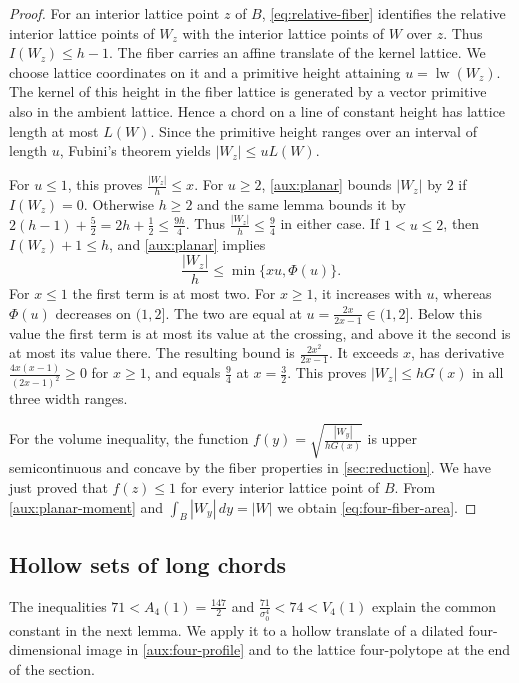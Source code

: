 \documentclass[reqno, 11pt]{article}
\numberwithin{equation}{section}
\theoremstyle{definition}
\DeclareMathOperator{\lw}{lw}
\begin{document}
\begin{proof}
For an interior lattice point $z$ of $B$, \eqref{eq:relative-fiber}
identifies the relative interior lattice points of $W_z$ with the
interior lattice points of $W$ over $z$. Thus $I(W_z)\le h-1$.
The fiber carries an affine translate of the kernel lattice.
We choose lattice coordinates on it and a primitive height attaining
$u=\lw(W_z)$. The kernel of this height in the fiber lattice is
generated by a vector primitive also in the ambient lattice. Hence
a chord on a line of constant height has lattice length at most
$L(W)$. Since the primitive height ranges over an interval of length
$u$, Fubini's theorem yields $|W_z|\le uL(W)$.

For $u\le1$, this proves $\frac{|W_z|}{h}\le x$. For $u\ge2$,
\cref{aux:planar} bounds $|W_z|$ by $2$ if $I(W_z)=0$.
Otherwise $h\ge2$ and the same lemma bounds it by
$2(h-1)+\frac{5}{2}=2h+\frac{1}{2}\le\frac{9h}{4}$.
Thus $\frac{|W_z|}{h}\le\frac{9}{4}$ in either case. If $1<u\le2$,
then $I(W_z)+1\le h$, and \cref{aux:planar} implies
\[
                 \frac{|W_z|}{h}\le\min\{xu,\Phi(u)\}.
\]
For $x\le1$ the first term is at most two. For $x\ge1$, it increases
with $u$, whereas $\Phi(u)$ decreases on $(1,2]$. The two are equal
at $u=\frac{2x}{2x-1}\in(1,2]$. Below this value the first term is at
most its value at the crossing, and above it the second is at most its
value there. The resulting bound is $\frac{2x^2}{2x-1}$.
It exceeds $x$, has derivative $\frac{4x(x-1)}{(2x-1)^2}\ge0$ for
$x\ge1$, and equals $\frac{9}{4}$ at $x=\frac{3}{2}$. This proves
$|W_z|\le hG(x)$ in all three width ranges.

For the volume inequality, the function
$f(y)=\sqrt{\frac{|W_y|}{hG(x)}}$ is upper semicontinuous and concave
by the fiber properties in \cref{sec:reduction}. We have just proved
that $f(z)\le1$ for every interior lattice point of $B$. From
\cref{aux:planar-moment} and $\int_B |W_y|\,dy=|W|$ we obtain
\eqref{eq:four-fiber-area}.
\end{proof}

\subsection{Hollow sets of long chords}

The inequalities $71<A_4(1)=\frac{147}{2}$ and $\frac{71}{\sigma_0^4}<74<V_4(1)$
explain the common constant in the next lemma. We apply it to a
hollow translate of a dilated four-dimensional image in
\cref{aux:four-profile} and to the lattice four-polytope at
the end of the section.
\end{document}
